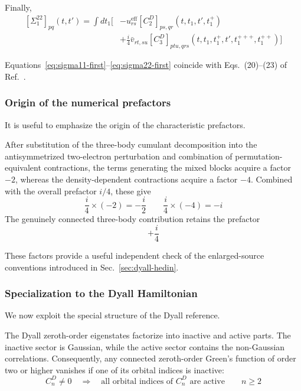 \documentclass[aip,jcp,reprint,noshowkeys,superscriptaddress]{revtex4-1}
\begin{document}
Finally,
\begin{equation}
  \begin{aligned}
  [\Sigma_1^{22}]_{pq}(t,t')
  =
  \int dt_1
  \Big[
  &
  -
  u^{\mathrm{eff}}_{rs}
  [C_2^D]_{ps,qr}
  (t,t_1,t',t_1^+)
  \\
  &
  +
  \frac{i}{4}
  \bar v_{rt,su}
  [C_3^D]_{ptu,qrs}
  (t,t_1,t_1^+,t',t_1^{+++},t_1^{++})
  \Big]
  \end{aligned}
  \label{eq:sigma22-first}
\end{equation}

Equations~\eqref{eq:sigma11-first}--\eqref{eq:sigma22-first}
coincide with Eqs.~(20)--(23) of Ref.~\cite{WangFangLi2026}.


\subsubsection{Origin of the numerical prefactors}

It is useful to emphasize the origin of the characteristic prefactors.

After substitution of the three-body cumulant decomposition into the
antisymmetrized two-electron perturbation and combination of
permutation-equivalent contractions, the terms generating the mixed blocks
acquire a factor $-2$, whereas the density-dependent contractions acquire a
factor $-4$.  Combined with the overall prefactor $i/4$, these give
\begin{equation}
  \frac{i}{4}\times(-2)
  =
  -\frac{i}{2}
  \qquad
  \frac{i}{4}\times(-4)
  =
  -i
\end{equation}
The genuinely connected three-body contribution retains the prefactor
\begin{equation}
  +\frac{i}{4}
\end{equation}

These factors provide a useful independent check of the enlarged-source
conventions introduced in Sec.~\ref{sec:dyall-hedin}.


\subsubsection{Specialization to the Dyall Hamiltonian}

We now exploit the special structure of the Dyall reference.

The Dyall zeroth-order eigenstates factorize into inactive and active
parts.  The inactive sector is Gaussian, while the active sector
contains the non-Gaussian correlations.  Consequently, any connected
zeroth-order Green's function of order two or higher vanishes if one
of its orbital indices is inactive:
\begin{equation}
  C_n^D
  \neq 0
  \quad\Longrightarrow\quad
  \text{all orbital indices of }C_n^D
  \text{ are active}
  \qquad
  n\ge2
  \label{eq:cumulant-active-support}
\end{equation}
\end{document}
